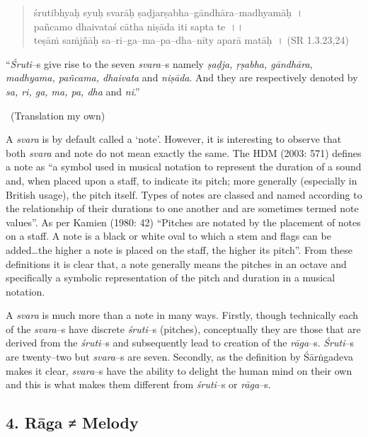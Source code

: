 \begin{verse}
śrutibhyaḥ syuḥ svarāḥ ṣaḍjarṣabha–gāndhāra–madhyamāḥ~।\\ pañcamo dhaivataś cātha niṣāda iti sapta te~।।\\ teṣāṁ saṁjñāḥ sa–ri–ga–ma–pa–dha–nīty aparā matāḥ~। (SR 1.3.23,24)
\end{verse}

\begin{myquote}
“\textit{Śruti}–s give rise to the seven \textit{svara}–s namely \textit{ṣaḍja, ṛṣabha, gāndhāra, madhyama, pañcama, dhaivata} and \textit{niṣāda}. And they are respectively denoted by \textit{sa, ri, ga, ma, pa, dha} and \textit{ni}.” 

~\hfill (Translation my own)
\end{myquote}

A \textit{svara} is by default called a ‘note’. However, it is interesting to observe that both \textit{svara} and note do not mean exactly the same. The HDM (2003: 571) defines a note as “a symbol used in musical notation to represent the duration of a sound and, when placed upon a staff, to indicate its pitch; more generally (especially in British usage), the pitch itself. Types of notes are classed and named according to the relationship of their durations to one another and are sometimes termed note values”. As per Kamien (1980: 42) “Pitches are notated by the placement of notes on a staff. A note is a black or white oval to which a stem and flags can be added…the higher a note is placed on the staff, the higher its pitch”. From these definitions it is clear that, a note generally means the pitches in an octave and specifically a symbolic representation of the pitch and duration in a musical notation. 

A \textit{svara} is much more than a note in many ways. Firstly, though technically each of the \textit{svara}–s have discrete \textit{śruti}–s (pitches), conceptually they are those that are derived from the \textit{śruti}–s and subsequently lead to creation of the \textit{rāga}–s. \textit{Śruti}–s are twenty–two but \textit{svara}–s are seven. Secondly, as the definition by Śārṅgadeva makes it clear, \textit{svara}–s have the ability to delight the human mind on their own and this is what makes them different from \textit{śruti}–s or \textit{rāga}–s.


\subsection*{4. Rāga ≠ Melody}

